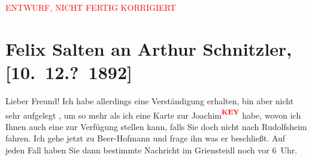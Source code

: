 
\begin{center}
            \textcolor{red}{ENTWURF, NICHT FERTIG KORRIGIERT}
                      \end{center}
            
         
         \renewcommand{\erwaehntePersonen}{Personen:  Andor, Richard Beer-Hofmann, Richard Specht}
         \renewcommand{\erwaehnteOrte}{Orte: Café Griensteidl, Café Pfob, Gürtel, Volkstheater in Rudolphsheim, Wien, XV., Rudolfsheim-Fünfhaus}
         \renewcommand{\erwaehnteWerke}{}
               \section[Felix Salten an Arthur Schnitzler, {[}10. 12.? 1892{]}]{ Felix Salten an Arthur Schnitzler, {[}10. 12.? 1892{]}}\nopagebreak{}\rehead{ }\begin{ledgroupsized}[t]{13cm}\normalsize\beginnumbering \toendnotes[C]{\smallbreak\pagebreak[2]} 
\toendnotes[C]{\smallbreak}\pstart
           \noindent{}{\pb}Lieber Freund! Ich habe allerdings eine Verständigung erhalten, bin
               aber nicht sehr aufgelegt \label{K_L03119-1v}\label{K_L03119-1h}, um so mehr als ich eine Karte zur Joachim\textcolor{red}{\textsuperscript{\textbf{KEY}}} habe, wovon ich Ihnen auch eine zur Verfügung stellen kann,
               falls Sie doch nicht nach Rudolfsheim fahren.\pend
           \pstart
           Ich gehe jetzt zu Beer-Hofmann und frage ihn was er
               beschließt. Auf jeden Fall {\pb}haben Sie dann bestimmte Nachricht im Griensteidl noch vor 6 Uhr. \pend

\end{ledgroupsized}
